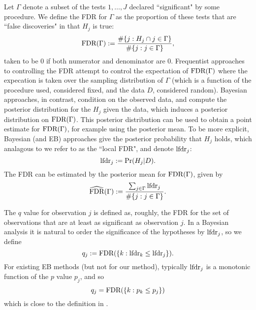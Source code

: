 \documentclass[11pt]{article}
\begin{document}
Let $\Gamma$ denote a subset of the tests $1,\dots,J$ declared ``significant" by some procedure. 
We define the FDR for $\Gamma$ as the proportion of these tests that are ``false discoveries" in that $H_j$ is true:
\begin{equation} \label{eqn:FDR}
\text{FDR}(\Gamma) := \frac{\#\{j: H_j \cap j \in \Gamma\}}{\#\{j: j \in \Gamma\}},
\end{equation}
taken to be 0 if both numerator and denominator are 0. Frequentist approaches to controlling the FDR attempt to control
the expectation of $\text{FDR}(\Gamma)$ where the expecation is taken over the sampling distribution of $\Gamma$ (which is a function of the procedure
used, considered fixed, and the data $D$, considered random). Bayesian approaches, in contrast, condition on the observed data, and compute
the posterior distribution for the $H_j$ given the data, which induces a posterior distribution on $\text{FDR}(\Gamma)$. This posterior
distribution can be used to obtain a point estimate for $\text{FDR}(\Gamma)$, for example using the posterior mean. 
To be more explicit, Bayesian (and EB) approaches give the posterior probability that $H_j$ holds, which
analagous to \cite{efron2008microarrays} we refer to as the ``local FDR", and denote $\text{lfdr}_j$:
\begin{equation} \label{eqn:fdr}
\text{lfdr}_j := \Pr(H_j | D).
\end{equation}
The FDR can be estimated by the posterior mean for $\text{FDR}(\Gamma)$, given by
\begin{equation} 
\widehat{\text{FDR}}(\Gamma) := \frac{\sum_{j \in \Gamma} \text{lfdr}_j }{\#\{j: j \in \Gamma\}}.
\end{equation}

The $q$ value for observation $j$ is defined \cite{storey.03} as, roughly, the FDR for the set of observations that are at least as significant as observation $j$.
In a Bayesian analysis it is natural to order the significance of the hypotheses by $\text{lfdr}_j$, so we define
\begin{equation}
q_j := \text{FDR}(\{k:\text{lfdr}_k \leq \text{lfdr}_j\}).
\end{equation}
For existing EB methods (but not for our method), typically $\text{lfdr}_j$ is a monotonic function of the $p$ value $p_j$, and so
\begin{equation}
q_j = \text{FDR}(\{k:p_k \leq p_j\})
\end{equation}
which is close to the definition in \cite{storey.03}.
\end{document}
